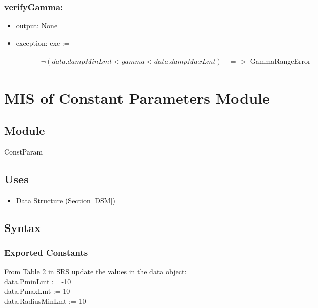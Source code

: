 \documentclass[12pt, titlepage]{article}
\begin{document}
	
	\subsubsection*{verifyGamma:} \begin{itemize} \item output: None \item
		exception: exc :=  \noindent \begin{longtable*}[l]{l l} \ \ \ \ \ \ $\neg
			(data.dampMinLmt <  gamma < data.dampMaxLmt)$ & $=>$ GammaRangeError\\
		\end{longtable*}
		
	\end{itemize}
	
	
	\newpage %
	\section{MIS of Constant Parameters Module} \label{CPM}
	
	
	\subsection{Module} ConstParam
	
	\subsection{Uses} \begin{itemize} \item Data Structure (Section \ref{DSM})
	\end{itemize}
	
	\subsection{Syntax}
	
	\subsubsection{Exported Constants}
	
	From Table 2 in SRS update the values in the data object:\\
	
	data.PminLmt := -10\\
	
	data.PmaxLmt := 10\\
	
	data.RadiusMinLmt := 10\\
	
\end{document}
